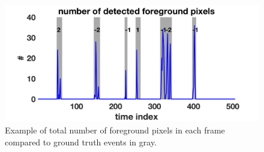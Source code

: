 \documentclass[12pt,oneside]{article} %
\begin{document}
\begin{figure}[!htb]  %
\centering
\includegraphics[scale=0.45]{images/abs_example.png}
\caption{Example of total number of foreground pixels in each frame compared to 
ground truth events in gray.}
\label{abs_example}
\end{figure}
\end{document}
